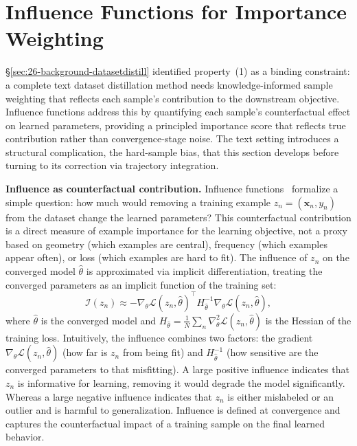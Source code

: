 \section{Influence Functions for Importance Weighting} \label{sec:27-background-influence}

\S\ref{sec:26-background-datasetdistill} identified property~(1) as a binding constraint: a complete text dataset distillation method needs knowledge-informed sample weighting that reflects each sample's contribution to the downstream objective.
Influence functions address this by quantifying each sample's counterfactual effect on learned parameters, providing a principled importance score that reflects true contribution rather than convergence-stage noise.
The text setting introduces a structural complication, the hard-sample bias, that this section develops before turning to its correction via trajectory integration.

\begin{foldable}
  \textbf{Influence as counterfactual contribution.}
  Influence functions~\cite{cook1982residuals,koh2017understanding} formalize a simple question: how much would removing a training example $z_n = (\mathbf{x}_n, y_n)$ from the dataset change the learned parameters?
  This counterfactual contribution is a direct measure of example importance for the learning objective, not a proxy based on geometry (which examples are central), frequency (which examples appear often), or loss (which examples are hard to fit).
  The influence of $z_n$ on the converged model $\hat\theta$ is approximated via implicit differentiation, treating the converged parameters as an implicit function of the training set:
  \begin{equation}
    \mathcal{I}(z_n) \approx
    -\nabla_\theta \mathcal{L}(z_n, \hat\theta)^\top
    H_{\hat\theta}^{-1}
    \nabla_\theta \mathcal{L}(z_n, \hat\theta),
    \label{eq:influence}
  \end{equation}
  where $\hat\theta$ is the converged model and $H_{\hat\theta} = \frac{1}{N}\sum_n \nabla^2_\theta \mathcal{L}(z_n, \hat\theta)$ is the Hessian of the training loss.
  Intuitively, the influence combines two factors: the gradient $\nabla_\theta \mathcal{L}(z_n, \hat\theta)$ (how far is $z_n$ from being fit) and $H_{\hat\theta}^{-1}$ (how sensitive are the converged parameters to that misfitting).
  A large positive influence indicates that $z_n$ is informative for learning, removing it would degrade the model significantly.
  Whereas a large negative influence indicates that $z_n$ is either mislabeled or an outlier and is harmful to generalization.
  Influence is defined at convergence and captures the counterfactual impact of a training sample on the final learned behavior.
\end{foldable}

